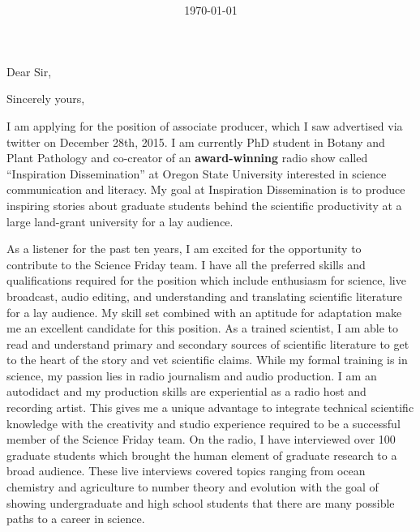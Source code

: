 \documentclass[10pt,letterpaper,sans]{modernresume} %
\title{ } %
\begin{document}


\date{\today} %
\opening{Dear Sir,} %
\closing{Sincerely yours,} %

\makelettertitle %

I am applying for the position of associate producer, which I saw advertised via
twitter on December 28th, 2015. I am currently PhD student in Botany and Plant
Pathology and co-creator of an \textbf{award-winning} radio show called
``Inspiration Dissemination'' at Oregon State University interested in science
communication and literacy. My goal at Inspiration Dissemination is to produce
inspiring stories about graduate students behind the scientific productivity at
a large land-grant university for a lay audience.

As a listener for the past ten years, I am excited for the opportunity to
contribute to the Science Friday team. I have all the preferred skills and
qualifications required for the position which include enthusiasm for science,
live broadcast, audio editing, and understanding and translating scientific
literature for a lay audience. My skill set combined with an aptitude for
adaptation make me an excellent candidate for this position. As a trained
scientist, I am able to read and understand primary and secondary sources of
scientific literature to get to the heart of the story and vet scientific
claims. While my formal training is in science, my passion lies in radio
journalism and audio production. I am an autodidact and my production skills are
experiential as a radio host and recording artist. This gives me a unique
advantage to integrate technical scientific knowledge with the creativity and
studio experience required to be a successful member of the Science Friday team.
On the radio, I have interviewed over 100 graduate students which brought the
human element of graduate research to a broad audience. These live interviews
covered topics ranging from ocean chemistry and agriculture to number theory and
evolution with the goal of showing undergraduate and high school students that
there are many possible paths to a career in science.
\end{document}
